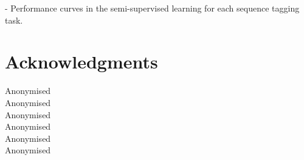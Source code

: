 \documentclass[11pt]{article}
\begin{document}
- Performance curves in the semi-supervised learning for each sequence tagging task.




\section*{Acknowledgments}

Anonymised\\
Anonymised\\
Anonymised\\
Anonymised\\
Anonymised\\
Anonymised\\




\end{document}

